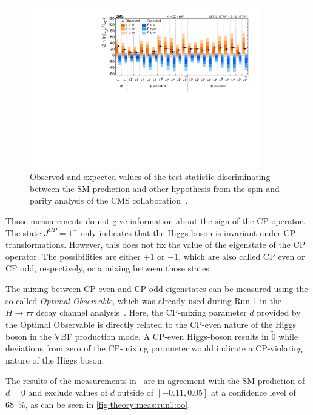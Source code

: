 \begin{figure}[htbp]
    \centering
    \includegraphics[width=0.9\textwidth]{./figures/theory/cp_cms_results.pdf}
    \caption{Observed and expected values of the test statistic discriminating between the SM
             prediction and other hypothesis from the spin and parity analysis of the CMS
             collaboration~\cite{HiggsCPCMS}.}\label{fig:theory:meas:run1:cp}
\end{figure}

Those measurements do not give information about the sign of the CP operator.
The state $J^{CP} = 1^+$ only indicates that the Higgs boson is invariant under CP transformations.
However, this does not fix the value of the eigenstate of the CP operator.
The possibilities are either $+1$ or $-1$, which are also called CP even or CP odd, respectively, or a mixing between those states.

The mixing between CP-even and CP-odd eigenstates can be measured using the so-called \emph{Optimal Observable}, which
was already used during Run-1 in the $H \to \tau\tau$ decay channel analysis~\cite{HiggsCPTauTau}.
Here, the CP-mixing parameter $\tilde{d}$ provided by the Optimal Observable is directly related to the CP-even nature of the Higgs boson in the
VBF production mode.
A CP-even Higgs-boson results in $\tilde{0}$ while deviations from zero of the CP-mixing parameter would indicate a CP-violating nature of the Higgs boson.

The results of the measurements in~\cite{HiggsCPTauTau} are in agreement with the SM prediction of $\tilde{d} = 0$ and exclude values of $\tilde{d}$ outside of
$\left[-0.11, 0.05\right]$ at a confidence level of \SI{68}{\percent}, as can be seen in \cref{fig:theory:meas:run1:oo}.

